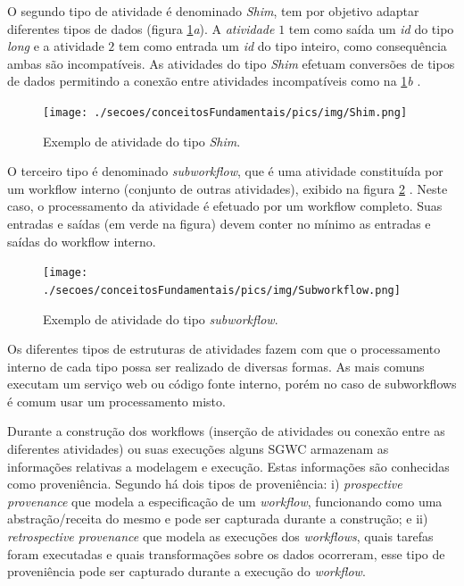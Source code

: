 O segundo tipo de atividade é denominado \emph{Shim}, tem por objetivo adaptar diferentes tipos de dados (figura \ref{figura_atividade_shim}\emph{a}). A \emph{atividade} \(1\) tem como saída um \emph{id} do tipo \emph{long} e a atividade \(2\) tem como entrada um \emph{id} do tipo inteiro, como consequência ambas são incompatíveis. As atividades do tipo \emph{Shim} efetuam conversões de tipos de dados permitindo a conexão entre atividades incompatíveis como na \ref{figura_atividade_shim}\emph{b} \cite{Lin2009}.
\begin{figure}[!hbt]
    \centering  
    \caption{Exemplo de atividade do tipo \emph{Shim}.}
    \texttt{[image: ./secoes/conceitosFundamentais/pics/img/Shim.png]}    
	\label{figura_atividade_shim}
\end{figure}

O terceiro tipo é denominado \emph{subworkflow}, que é uma atividade constituída por um workflow interno (conjunto de outras atividades), exibido na figura \ref{figura_atividade_subworkflow} \cite{medeiros_woodss_2005}. Neste caso, o processamento da atividade é efetuado por um workflow completo. Suas entradas e saídas (em verde na figura) devem conter no mínimo as entradas e saídas do workflow interno.
\begin{figure}[!hbt]
    \centering  
    \caption{Exemplo de atividade do tipo \emph{subworkflow}.}
    \texttt{[image: ./secoes/conceitosFundamentais/pics/img/Subworkflow.png]}    
	\label{figura_atividade_subworkflow}
\end{figure}

Os diferentes tipos de estruturas de atividades fazem com que o processamento interno de cada tipo possa ser realizado de diversas formas. As mais comuns executam um serviço web ou código fonte interno, porém no caso de subworkflows é comum usar um processamento misto. 

Durante a construção dos workflows (inserção de atividades ou conexão entre as diferentes atividades) ou suas execuções alguns SGWC armazenam as informações relativas a modelagem e execução. Estas informações são conhecidas como proveniência. Segundo  há dois tipos de proveniência: i) \emph{prospective provenance} que modela a especificação de um \emph{workflow}, funcionando como uma abstração/receita do mesmo e pode ser capturada durante a construção; e ii) \emph{retrospective provenance} que modela as execuções dos \emph{workflows}, quais tarefas foram executadas e quais transformações sobre os dados ocorreram, esse tipo de proveniência pode ser capturado durante a execução do \emph{workflow}.

